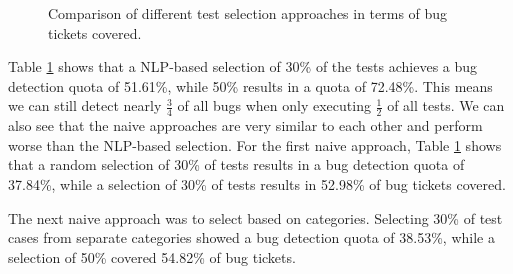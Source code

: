 \begin{figure}[H]
    \centering
    \caption{Comparison of different test selection approaches in terms of bug tickets covered.}
    \label{fig:bugticketcoverage}
\end{figure}

Table \ref{fig:bugticketcoverage} shows that a \ac{NLP}-based selection of 30\% of the tests achieves a bug detection quota of 51.61\%, while 50\% results in a quota of 72.48\%.
This means we can still detect nearly $\frac{3}{4}$ of all bugs when only executing $\frac{1}{2}$ of all tests.
We can also see that the naive approaches are very similar to each other and perform worse than the \ac{NLP}-based selection. 
For the first naive approach, Table \ref{fig:bugticketcoverage} shows that a random selection of 30\% of tests results in a bug detection quota of 37.84\%, while a selection of 30\% of tests results in 52.98\% of bug tickets covered.

The next naive approach was to select based on categories. Selecting 30\% of test cases from separate categories showed a bug detection quota of 38.53\%, while a selection of 50\% covered 54.82\% of bug tickets.